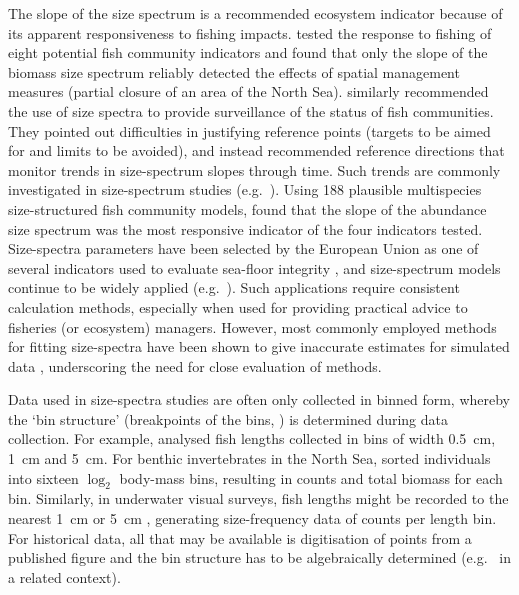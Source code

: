 \documentclass[12pt, letter]{article}
\newcommand{\logtwo}{\log_{\mathrm{2}}}
\newcommand{\MEE}{erpbb17}     %
\begin{document}

The slope of the size spectrum is a
recommended ecosystem indicator because of its apparent responsiveness to
fishing impacts.
\citet{pj05} tested the response to fishing of eight potential fish community
indicators and found that only the slope of the biomass size spectrum reliably
detected the
effects of spatial management measures (partial closure of an area of
the North Sea). \citet{jd05} similarly recommended the use of size spectra to
provide
surveillance of the status of fish communities. They pointed out difficulties in
justifying reference points (targets to be aimed for and limits to be avoided),
and instead recommended reference directions that monitor trends in
size-spectrum slopes through time. Such trends are commonly investigated in
size-spectrum studies (e.g.~\citealt{blan05, bblhw12}).
Using 188 plausible multispecies size-structured fish community
models, \citet{tllcj15} found that the slope of the abundance size spectrum was
the most responsive indicator of the four indicators tested.
Size-spectra parameters
have been selected by the European Union as one of several indicators used to
evaluate sea-floor integrity \citep{europe10, rice12}, and size-spectrum models
continue to be widely applied
(e.g.~\citealt{tfp14, amln16, ssmarp16, wsj18, zcxxr18, mnwb18, va18, zhou19}).
Such applications require
consistent calculation methods, especially when used for providing practical
advice to fisheries (or ecosystem) managers.
However,
most commonly employed methods for fitting
size-spectra have been shown to give inaccurate estimates for simulated data
\citep{\MEE}, underscoring the need for close evaluation of methods.



Data used in size-spectra studies are often only collected in binned form,
whereby the
`bin structure' (breakpoints of the bins, \citealt{monn16}) is determined during
data collection. For example, \citet{dgpr05} analysed fish lengths collected in
bins of width 0.5~cm, 1~cm and 5~cm. For benthic invertebrates in the
North Sea,
\citet{mj06} sorted individuals into sixteen $\logtwo$ body-mass bins, resulting
in counts and total biomass for each bin.
Similarly, in underwater visual surveys, fish lengths might be recorded to
the nearest 1~cm \citep{mcco16} or 5~cm \citep{rwnz11},
generating size-frequency data of counts per length bin.
For historical data, all that may be available is
digitisation of points from a
published figure and the bin structure has to be
algebraically determined (e.g.~\citealt{edwa11} in a related context).
\end{document}
